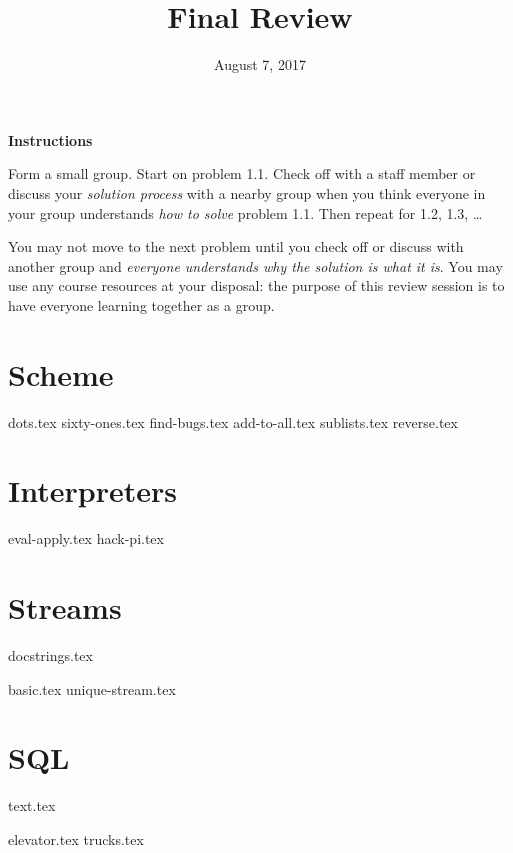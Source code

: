 \documentclass{exam}
\title{Final Review}
\date{August 7, 2017}
\begin{document}
\maketitle

\textbf{Instructions}

Form a small group. Start on problem 1.1. Check off with a staff member or
discuss your \emph{solution process} with a nearby group when you think everyone
in your group understands \emph{how to solve} problem 1.1. Then repeat for 1.2,
1.3, \ldots

You may not move to the next problem until you check off or discuss with another
group and \emph{everyone understands why the solution is what it is}. You may
use any course resources at your disposal: the purpose of this review session is
to have everyone learning together as a group.

\lstset{language=Scheme}
\section{Scheme}
\begin{questions}
{dots.tex}
{sixty-ones.tex}
{find-bugs.tex}
{add-to-all.tex}
{sublists.tex}
{reverse.tex}
\end{questions}

\clearpage

\section{Interpreters}
\begin{questions}
{eval-apply.tex}
{hack-pi.tex}
\end{questions}

\clearpage

\lstset{language=Python}
\section{Streams}
{docstrings.tex}
\begin{questions}
{basic.tex}
{unique-stream.tex}
\end{questions}

\clearpage

\lstset{language=SQL}
\section{SQL}
{text.tex}
\begin{questions}
{elevator.tex}
{trucks.tex}
\end{questions}
\end{document}
